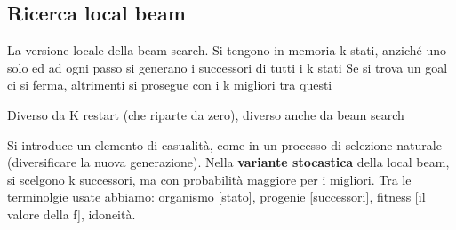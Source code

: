 \subsection{Ricerca local beam}
La versione locale della beam search. Si tengono in memoria k stati, anziché uno solo ed ad ogni passo si generano i successori di tutti i k stati
Se si trova un goal ci si ferma, altrimenti si prosegue con i k migliori tra questi
\begin{note}
    Diverso da K restart (che riparte da zero), diverso anche da beam search
\end{note}
\hspace{-15pt}Si introduce un elemento di casualità, come in un processo di selezione naturale (diversificare la nuova generazione).
Nella \textbf{variante stocastica} della local beam, si scelgono k successori, ma con probabilità maggiore per i migliori. Tra le terminolgie
usate abbiamo: organismo [stato], progenie [successori], fitness [il valore della f], idoneità.

